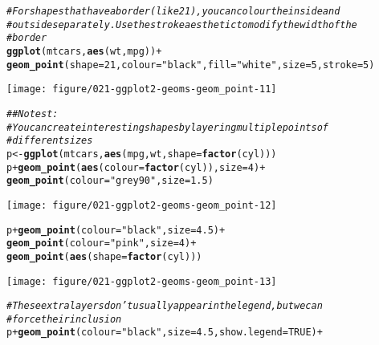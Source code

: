 \documentclass[a4paper,titlepage]{tufte-handout}\usepackage[]{graphicx}\usepackage[]{color}
\makeatletter
\def\maxwidth{ %
  \ifdim\Gin@nat@width>\linewidth
    \linewidth
  \else
    \Gin@nat@width
  \fi
}
\newcommand{\hlnum}[1]{\textcolor[rgb]{0.686,0.059,0.569}{#1}}%
\newcommand{\hlstr}[1]{\textcolor[rgb]{0.192,0.494,0.8}{#1}}%
\newcommand{\hlcom}[1]{\textcolor[rgb]{0.678,0.584,0.686}{\textit{#1}}}%
\newcommand{\hlopt}[1]{\textcolor[rgb]{0,0,0}{#1}}%
\newcommand{\hlstd}[1]{\textcolor[rgb]{0.345,0.345,0.345}{#1}}%
\newcommand{\hlkwb}[1]{\textcolor[rgb]{0.69,0.353,0.396}{#1}}%
\newcommand{\hlkwc}[1]{\textcolor[rgb]{0.333,0.667,0.333}{#1}}%
\newcommand{\hlkwd}[1]{\textcolor[rgb]{0.737,0.353,0.396}{\textbf{#1}}}%
\newenvironment{kframe}{%
 \def\at@end@of@kframe{}%
 \ifinner\ifhmode%
  \def\at@end@of@kframe{\end{minipage}}%
  \begin{minipage}{\columnwidth}%
 \fi\fi%
 \def\FrameCommand##1{\hskip\@totalleftmargin \hskip-\fboxsep
 \colorbox{shadecolor}{##1}\hskip-\fboxsep
     \hskip-\linewidth \hskip-\@totalleftmargin \hskip\columnwidth}%
 \MakeFramed {\advance\hsize-\width
   \@totalleftmargin\z@ \linewidth\hsize
   \@setminipage}}%
 {\par\unskip\endMakeFramed%
 \at@end@of@kframe}
\newenvironment{knitrout}{}{} %
\makeatother
\begin{document}
\begin{knitrout}
\begin{kframe}
\begin{alltt}
\hlcom{# For shapes that have a border (like 21), you can colour the inside and}
\hlcom{# outside separately. Use the stroke aesthetic to modify the width of the}
\hlcom{# border}
\hlkwd{ggplot}\hlstd{(mtcars,} \hlkwd{aes}\hlstd{(wt, mpg))} \hlopt{+}
  \hlkwd{geom_point}\hlstd{(}\hlkwc{shape} \hlstd{=} \hlnum{21}\hlstd{,} \hlkwc{colour} \hlstd{=} \hlstr{"black"}\hlstd{,} \hlkwc{fill} \hlstd{=} \hlstr{"white"}\hlstd{,} \hlkwc{size} \hlstd{=} \hlnum{5}\hlstd{,} \hlkwc{stroke} \hlstd{=} \hlnum{5}\hlstd{)}
\end{alltt}
\end{kframe}
\texttt{[image: figure/021-ggplot2-geoms-geom\_point-11]} 
\begin{kframe}\begin{alltt}
\hlcom{## No test: }
\hlcom{# You can create interesting shapes by layering multiple points of}
\hlcom{# different sizes}
\hlstd{p} \hlkwb{<-} \hlkwd{ggplot}\hlstd{(mtcars,} \hlkwd{aes}\hlstd{(mpg, wt,} \hlkwc{shape} \hlstd{=} \hlkwd{factor}\hlstd{(cyl)))}
\hlstd{p} \hlopt{+} \hlkwd{geom_point}\hlstd{(}\hlkwd{aes}\hlstd{(}\hlkwc{colour} \hlstd{=} \hlkwd{factor}\hlstd{(cyl)),} \hlkwc{size} \hlstd{=} \hlnum{4}\hlstd{)} \hlopt{+}
  \hlkwd{geom_point}\hlstd{(}\hlkwc{colour} \hlstd{=} \hlstr{"grey90"}\hlstd{,} \hlkwc{size} \hlstd{=} \hlnum{1.5}\hlstd{)}
\end{alltt}
\end{kframe}
\texttt{[image: figure/021-ggplot2-geoms-geom\_point-12]} 
\begin{kframe}\begin{alltt}
\hlstd{p} \hlopt{+} \hlkwd{geom_point}\hlstd{(}\hlkwc{colour} \hlstd{=} \hlstr{"black"}\hlstd{,} \hlkwc{size} \hlstd{=} \hlnum{4.5}\hlstd{)} \hlopt{+}
  \hlkwd{geom_point}\hlstd{(}\hlkwc{colour} \hlstd{=} \hlstr{"pink"}\hlstd{,} \hlkwc{size} \hlstd{=} \hlnum{4}\hlstd{)} \hlopt{+}
  \hlkwd{geom_point}\hlstd{(}\hlkwd{aes}\hlstd{(}\hlkwc{shape} \hlstd{=} \hlkwd{factor}\hlstd{(cyl)))}
\end{alltt}
\end{kframe}
\texttt{[image: figure/021-ggplot2-geoms-geom\_point-13]} 
\begin{kframe}\begin{alltt}
\hlcom{# These extra layers don't usually appear in the legend, but we can}
\hlcom{# force their inclusion}
\hlstd{p} \hlopt{+} \hlkwd{geom_point}\hlstd{(}\hlkwc{colour} \hlstd{=} \hlstr{"black"}\hlstd{,} \hlkwc{size} \hlstd{=} \hlnum{4.5}\hlstd{,} \hlkwc{show.legend} \hlstd{=} \hlnum{TRUE}\hlstd{)} \hlopt{+}

\end{alltt}
\end{kframe}
\end{knitrout}
\end{document}
